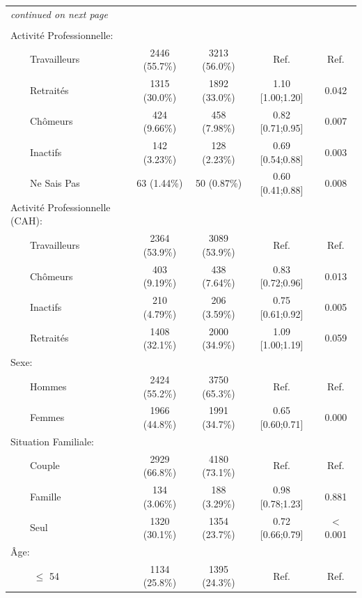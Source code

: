 \documentclass{book}
\begin{document}
\begin{longtable}{lcccc}
    \hline
    \hline  
    \endhead   
    \hline
    \multicolumn{5}{l}{\textit{continued on next page}} \\ 
    \endfoot   
    \multicolumn{5}{l}{}  \\ 
    \endlastfoot  
Activité Professionnelle: &              &              &                  &        \\ 
$\qquad$Travailleurs & 2446 (55.7\%) & 3213 (56.0\%) &       Ref.       &  Ref.  \\ 
$\qquad$Retraités & 1315 (30.0\%) & 1892 (33.0\%) & 1.10 [1.00;1.20] &  0.042 \\ 
$\qquad$Chômeurs & 424 (9.66\%)  & 458 (7.98\%)  & 0.82 [0.71;0.95] &  0.007 \\ 
$\qquad$Inactifs & 142 (3.23\%)  & 128 (2.23\%)  & 0.69 [0.54;0.88] &  0.003 \\ 
$\qquad$Ne Sais Pas &  63 (1.44\%)  &  50 (0.87\%)  & 0.60 [0.41;0.88] &  0.008 \\ 
Activité Professionnelle (CAH): &              &              &                  &        \\ 
$\qquad$Travailleurs & 2364 (53.9\%) & 3089 (53.9\%) &       Ref.       &  Ref.  \\ 
$\qquad$Chômeurs & 403 (9.19\%)  & 438 (7.64\%)  & 0.83 [0.72;0.96] &  0.013 \\ 
$\qquad$Inactifs & 210 (4.79\%)  & 206 (3.59\%)  & 0.75 [0.61;0.92] &  0.005 \\ 
$\qquad$Retraités & 1408 (32.1\%) & 2000 (34.9\%) & 1.09 [1.00;1.19] &  0.059 \\ 
Sexe: &              &              &                  &        \\ 
$\qquad$Hommes & 2424 (55.2\%) & 3750 (65.3\%) &       Ref.       &  Ref.  \\ 
$\qquad$Femmes & 1966 (44.8\%) & 1991 (34.7\%) & 0.65 [0.60;0.71] &  0.000 \\ 
Situation Familiale: &              &              &                  &        \\ 
$\qquad$Couple & 2929 (66.8\%) & 4180 (73.1\%) &       Ref.       &  Ref.  \\ 
$\qquad$Famille & 134 (3.06\%)  & 188 (3.29\%)  & 0.98 [0.78;1.23] &  0.881 \\ 
$\qquad$Seul & 1320 (30.1\%) & 1354 (23.7\%) & 0.72 [0.66;0.79] & $<$0.001 \\ 
Âge: &              &              &                  &        \\ 
$\qquad$ $\leq$ 54 & 1134 (25.8\%) & 1395 (24.3\%) &       Ref.       &  Ref.  \\ 

\end{longtable}
\end{document}
